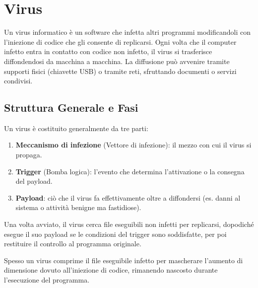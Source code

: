 \section{Virus}
Un virus informatico è un software che infetta altri programmi modificandoli con l'iniezione di codice che gli consente di replicarsi.
Ogni volta che il computer infetto entra in contatto con codice non infetto, il virus si trasferisce diffondendosi da macchina a macchina. La diffusione può avvenire tramite supporti fisici (chiavette USB) o tramite reti, sfruttando documenti o servizi condivisi.

\subsection{Struttura Generale e Fasi}

\begin{notebox}
Un virus è costituito generalmente da tre parti:
\begin{enumerate}
    \item \textbf{Meccanismo di infezione} (Vettore di infezione): il mezzo con cui il virus si propaga.
    \item \textbf{Trigger} (Bomba logica): l'evento che determina l'attivazione o la consegna del payload.
    \item \textbf{Payload}: ciò che il virus fa effettivamente oltre a diffondersi (es. danni al sistema o attività benigne ma fastidiose).
\end{enumerate}
Una volta avviato, il virus cerca file eseguibili non infetti per replicarsi, dopodiché esegue il suo payload se le condizioni del trigger sono soddisfatte, per poi restituire il controllo al programma originale.
\end{notebox}

Spesso un virus comprime il file eseguibile infetto per mascherare l'aumento di dimensione dovuto all'iniezione di codice, rimanendo nascosto durante l'esecuzione del programma.

\begin{center}
\end{center}

